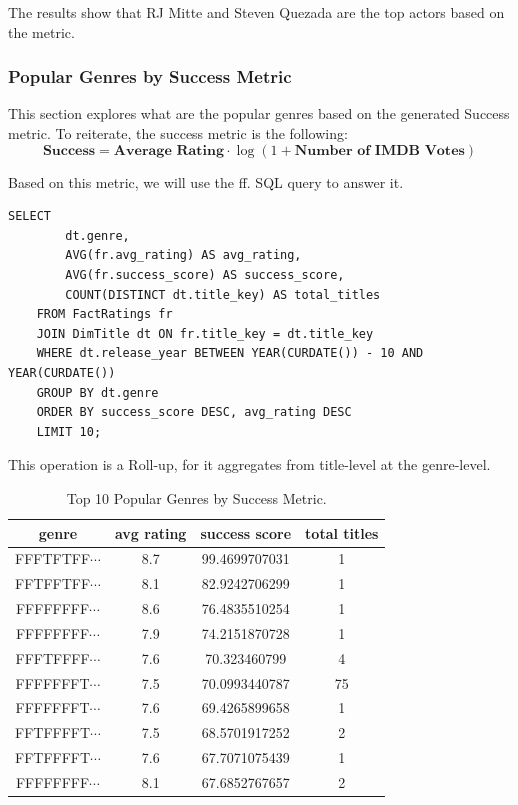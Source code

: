 The results show that RJ Mitte and Steven Quezada are the top actors based on the metric.

\subsubsection{Popular Genres by Success Metric}

This section explores what are the popular genres based on the generated Success metric. To reiterate, the success metric is the following:
$$
\textbf{Success} = \textbf{Average Rating} \cdot \log(1 + \textbf{Number of IMDB Votes})
$$

Based on this metric, we will use the ff. SQL query to answer it.

\begin{lstlisting}[style=SQLStyle]
	SELECT 
		dt.genre,
		AVG(fr.avg_rating) AS avg_rating,
		AVG(fr.success_score) AS success_score,
		COUNT(DISTINCT dt.title_key) AS total_titles
	FROM FactRatings fr
	JOIN DimTitle dt ON fr.title_key = dt.title_key
	WHERE dt.release_year BETWEEN YEAR(CURDATE()) - 10 AND YEAR(CURDATE())
	GROUP BY dt.genre
	ORDER BY success_score DESC, avg_rating DESC
	LIMIT 10;
\end{lstlisting}

This operation is a Roll-up, for it aggregates from title-level at the genre-level.

\begin{table}[h!]
	\centering
\begin{tabular}{|c|c|c|c|}
\hline
genre & avg rating & success score & total titles \\
\hline
FFFTFTFF$\cdots$ & 8.7 & 99.4699707031 & 1\\
FFTFFTFF$\cdots$ & 8.1 & 82.9242706299 & 1\\
FFFFFFFF$\cdots$ & 8.6 & 76.4835510254 & 1\\
FFFFFFFF$\cdots$ & 7.9 & 74.2151870728 & 1\\
FFFTFFFF$\cdots$ & 7.6 & 70.323460799 & 4\\
FFFFFFFT$\cdots$ & 7.5 & 70.0993440787 & 75\\
FFFFFFFT$\cdots$ & 7.6 & 69.4265899658 & 1\\
FFTFFFFT$\cdots$ & 7.5 & 68.5701917252 & 2\\
FFTFFFFT$\cdots$ & 7.6 & 67.7071075439 & 1\\
FFFFFFFF$\cdots$ & 8.1 & 67.6852767657 & 2\\
\hline
\end{tabular}
\caption{Top 10 Popular Genres by Success Metric.}
\end{table}

